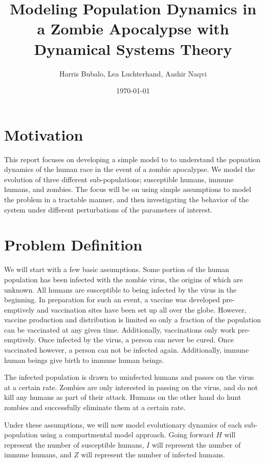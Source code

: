 \documentclass[
	12pt
]{article}
\title{Modeling Population Dynamics in a Zombie Apocalypse with Dynamical Systems Theory} %
\date{\today}
\author{Harris Bubalo, Lea Luchterhand, Aashir Naqvi}
\begin{document}
\maketitle
\pagebreak
\tableofcontents
\pagebreak
\section{Motivation}
This report focuses on developing a simple model to to understand the popuation dynamics of the human race in the event of a zombie apocalypse. We model the evolution of three different sub-populations; susceptible humans, immune humans, and zombies. The focus will be on using simple assumptions to model the problem in a tractable manner, and then investigating the behavior of the system under different perturbations of the parameters of interest.
\section{Problem Definition}
We will start with a few basic assumptions. Some portion of the human population has been infected with the zombie virus, the origins of which are unknown. All humans are susceptible to being infected by the virus in the beginning. In preparation for such an event, a vaccine was developed pre-emptively and vaccination sites have been set up all over the globe. However, vaccine production and distribution is limited so only a fraction of the population can be vaccinated at any given time. Additionally, vaccinations only work pre-emptively. Once infected by the virus, a person can never be cured. Once vaccinated however, a person can not be infected again. Additionally, immune human beings give birth to immune human beings.

The infected population is drawn to uninfected humans and passes on the virus at a certain rate. Zombies are only interested in passing on the virus, and do not kill any humans as part of their attack. Humans on the other hand do hunt zombies and successfully eliminate them at a certain rate. 

Under these assumptions, we will now model evolutionary dynamics of each sub-population using a compartmental model approach. Going forward $H$ will represent the number of susceptible humans, $I$ will represent the number of immune humans, and $Z$ will represent the number of infected humans.
\end{document}
